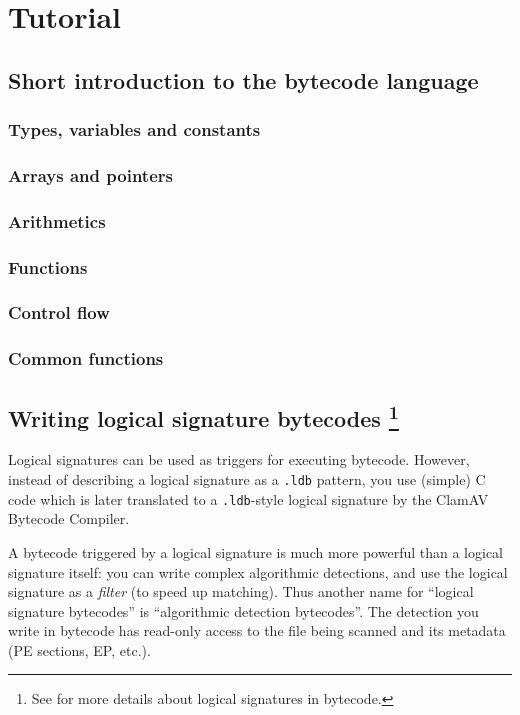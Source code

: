 \chapter{Tutorial}
\section{Short introduction to the bytecode language}
\subsection{Types, variables and constants}
\subsection{Arrays and pointers}
\subsection{Arithmetics}
\subsection{Functions}
\subsection{Control flow}
\subsection{Common functions}

\section[Writing logical signatures]{Writing logical signature bytecodes \footnote{See  for more details about logical signatures in bytecode.}}
Logical signatures can be used as triggers for executing bytecode. 
However, instead of describing a logical signature as a \verb+.ldb+ pattern, you use (simple) C code which is later
translated to a \verb+.ldb+-style logical signature by the ClamAV Bytecode Compiler.

A bytecode triggered by a logical signature is much more powerful than a logical signature itself:
you can write complex algorithmic detections, and use the logical signature as a \emph{filter} (to speed up matching).
Thus another name for ``logical signature bytecodes'' is ``algorithmic detection bytecodes''.
The detection you write in bytecode has read-only access to the file being scanned and its metadata
(PE sections, EP, etc.).

